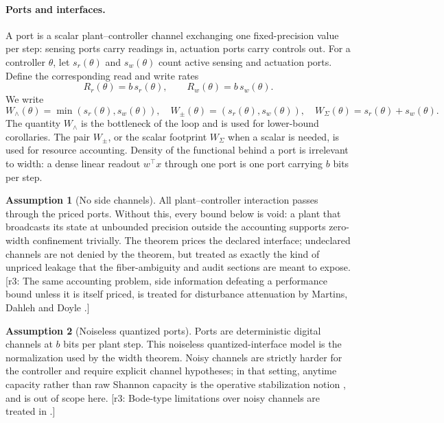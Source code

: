 \documentclass[11pt]{article}
\theoremstyle{definition}
\newtheorem{assumption}{Assumption}[section]
\theoremstyle{remark}
\newcommand{\W}{W}
\newcommand{\sr}{s_r}
\newcommand{\sw}{s_w}
\newcommand{\revnote}[1]{\textcolor{red!60!black}{[r3: #1]}}
\begin{document}
\paragraph{Ports and interfaces.} A port is a scalar plant--controller channel exchanging one fixed-precision value per step: sensing ports carry readings in, actuation ports carry controls out. For a controller $\theta$, let $\sr(\theta)$ and $\sw(\theta)$ count active sensing and actuation ports. Define the corresponding read and write rates
\begin{equation}
R_r(\theta)=b\,\sr(\theta),\qquad R_w(\theta)=b\,\sw(\theta). \label{eq:rates}
\end{equation}
We write
\begin{equation}
\W_\wedge(\theta)=\min(\sr(\theta),\sw(\theta)),\quad \W_\pm(\theta)=(\sr(\theta),\sw(\theta)),\quad \W_\Sigma(\theta)=\sr(\theta)+\sw(\theta). \label{eq:widths}
\end{equation}
The quantity $\W_\wedge$ is the bottleneck of the loop and is used for lower-bound corollaries. The pair $\W_\pm$, or the scalar footprint $\W_\Sigma$ when a scalar is needed, is used for resource accounting. Density of the functional behind a port is irrelevant to width: a dense linear readout $w^\top x$ through one port is one port carrying $b$ bits per step.

\begin{assumption}[No side channels]\label{as:side}
All plant--controller interaction passes through the priced ports. Without this, every bound below is void: a plant that broadcasts its state at unbounded precision outside the accounting supports zero-width confinement trivially. The theorem prices the declared interface; undeclared channels are not denied by the theorem, but treated as exactly the kind of unpriced leakage that the fiber-ambiguity and audit sections are meant to expose. \revnote{The same accounting problem, side information defeating a performance bound unless it is itself priced, is treated for disturbance attenuation by Martins, Dahleh and Doyle \cite{martins2007}.}
\end{assumption}

\begin{assumption}[Noiseless quantized ports]\label{as:noiseless}
Ports are deterministic digital channels at $b$ bits per plant step. This noiseless quantized-interface model is the normalization used by the width theorem. Noisy channels are strictly harder for the controller and require explicit channel hypotheses; in that setting, anytime capacity rather than raw Shannon capacity is the operative stabilization notion \cite{tatikonda2004,sahai2006}, and is out of scope here. \revnote{Bode-type limitations over noisy channels are treated in \cite{martins2008}.}
\end{assumption}
\end{document}
